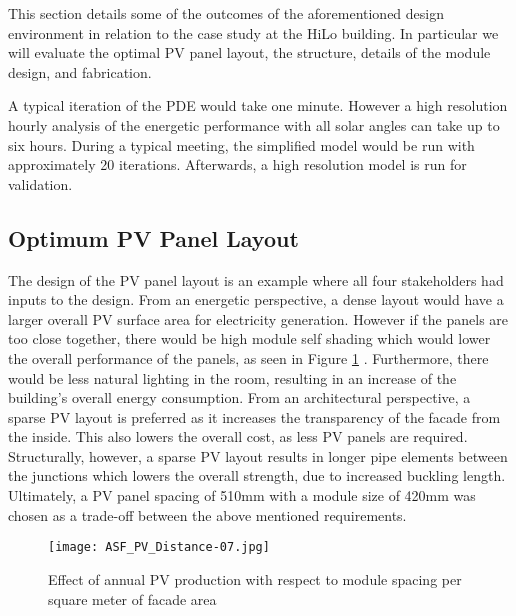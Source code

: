 

This section details some of the outcomes of the aforementioned design environment in relation to the case study at the HiLo building. In particular we will evaluate the optimal PV panel layout, the structure, details of the module design, and fabrication.

A typical iteration of the PDE would take one minute. However a high resolution hourly analysis of the energetic performance with all solar angles can take up to six hours. During a typical meeting, the simplified model would be run with approximately 20 iterations. Afterwards, a high resolution model is run for validation.

\subsection{Optimum PV Panel Layout}
The design of the PV panel layout is an example where all four stakeholders had inputs to the design. From an energetic perspective, a dense layout would have a larger overall PV surface area for electricity generation. However if the panels are too close together, there would be high module self shading which would lower the overall performance of the panels, as seen in Figure \ref{fig:spacing} \cite{hofer2016parametric}. Furthermore, there would be less natural lighting in the room, resulting in an increase of the building's overall  energy consumption. From an architectural perspective, a sparse PV layout is preferred as it increases the transparency of the facade from the inside. This also lowers the overall cost, as less PV panels are required. Structurally, however, a sparse PV layout results in longer pipe elements between the junctions which lowers the overall strength, due to increased buckling length. Ultimately, a PV panel spacing of 510mm with a module size of 420mm was chosen as a trade-off between the above mentioned requirements. 

\begin{figure}
\begin{center}
\texttt{[image: ASF\_PV\_Distance-07.jpg]}
\caption{Effect of annual PV production with respect to module spacing per square meter of facade area \cite{hofer2016parametric}}
\label{fig:spacing}
\end{center}
\end{figure}

